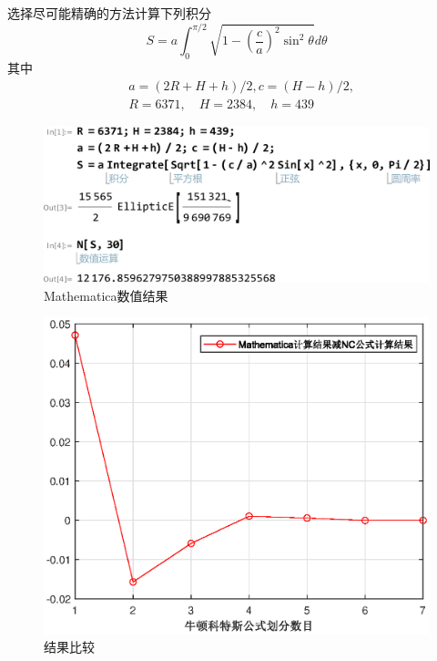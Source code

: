 \begin{ex}
	选择尽可能精确的方法计算下列积分
	$$
	S=a \int_0^{\pi / 2} \sqrt{1-\left(\frac{c}{a}\right)^2 \sin ^2 \theta} d \theta
	$$
	其中
	$$
	\begin{aligned}
		& a=(2 R+H+h) / 2, c=(H-h) / 2, \\
		& R=6371, \quad H=2384, \quad h=439
	\end{aligned}
	$$
\end{ex}
\qa 
\begin{figure}[H]
	\centering
	\includegraphics[width = 0.8\linewidth]{w11/fig1.png}
	\caption{Mathematica数值结果}
\end{figure}

\begin{figure}[H]
	\centering
	\includegraphics[width = 0.61\linewidth]{w11/fig.eps}
	\caption{结果比较}
\end{figure}

